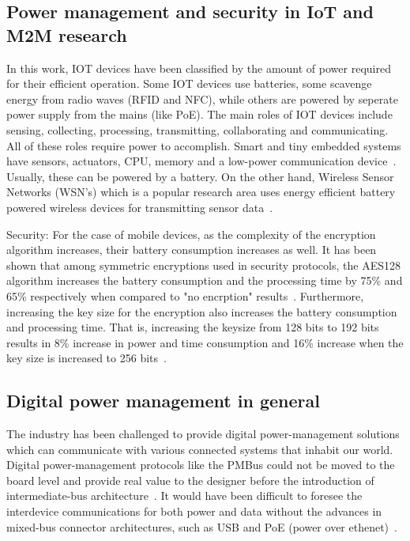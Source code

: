 \documentclass[final]{siamltex}
\begin{document}
\subsection{Power management and security in IoT and M2M research}

In this work, IOT devices have been classified by the amount of power required
for their efficient operation. Some IOT devices use batteries, some scavenge
energy from radio waves (RFID and NFC), while others are powered by seperate
power supply from the mains (like PoE).  The main roles of IOT devices include
sensing, collecting, processing, transmitting, collaborating and communicating.
All of these roles require power to accomplish. Smart and tiny embedded systems
have sensors, actuators, CPU, memory and a low-power communication
device~\cite{lopez2012adding}. Usually, these can be powered by a battery. On
the other hand, Wireless Sensor Networks (WSN's) which is a popular research
area uses energy efficient battery powered wireless devices for transmitting
sensor data~\cite{akyildiz2002wireless}.

Security:
For the case of mobile devices, as the complexity of the encryption algorithm
increases, their battery consumption increases as well. It has been shown that
among symmetric encryptions used in security protocols, the AES128 algorithm
increases the battery consumption and the processing time by 75\% and 65\%
respectively when compared to "no encrption" results~\cite{hamad2009energy}.
Furthermore, increasing the key size for the encryption also increases the
battery consumption and processing time. That is, increasing the keysize from
128 bits to 192 bits results in 8\% increase in power and time consumption and
16\% increase when the key size is increased to 256
bits~\cite{hamad2009energy}.

\subsection{Digital power management in general}

The industry has been challenged to provide digital power-management solutions
which can communicate with various connected systems that inhabit our world.
Digital power-management protocols like the PMBus could not be moved to the
board level and provide real value to the designer before the introduction of
intermediate-bus architecture~\cite{FutureIOT}. It would have been difficult to
foresee the interdevice communications for both power and data without the
advances in mixed-bus connector architectures, such as USB and PoE (power over
ethenet)~\cite{FutureIOT}. 
\end{document}
